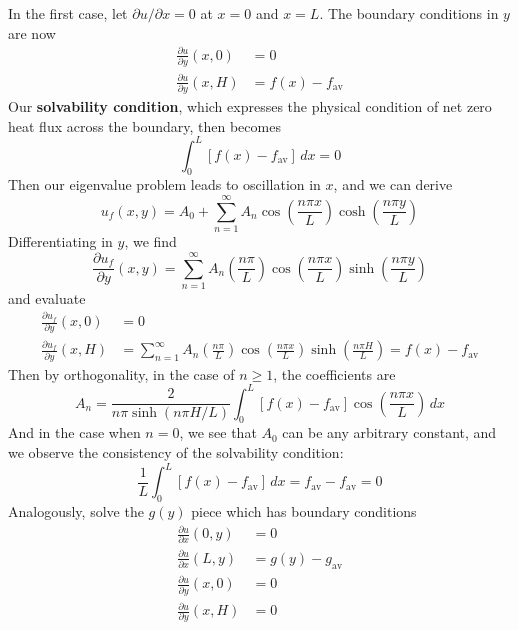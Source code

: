 \documentclass[a4paper]{article}
\begin{document}
\begin{enumerate}[label=(\alph*)]
	In the first case, let \( \partial u / \partial x = 0 \) at \( x = 0 \) and \( x = L \). The boundary conditions in \( y \) are now
	\begin{align*}
		\frac{\partial u}{\partial y}\!\left( x,0 \right) & = 0 \\
		\frac{\partial u}{\partial y}\!\left( x,H \right) & = f \!\left( x \right) - f_{\text{av}}
	\end{align*}
	Our \textbf{solvability condition}, which expresses the physical condition of net zero heat flux across the boundary, then becomes
	\[
		\int^{L}_{0} \!\left[ f \!\left( x \right) - f_{\text{av}} \right] \, dx = 0
	\]
	Then our eigenvalue problem leads to oscillation in \( x \), and we can derive
	\[
		u_{f}\!\left( x,y \right) = A_{0} + \sum^{\infty}_{n=1} A_{n}\cos\!\left(\frac{n \pi x}{L}\right)\cosh\!\left(\frac{n \pi y}{L}\right) 
	\]
	Differentiating in \( y \), we find
	\[
		\frac{\partial u_{f}}{\partial y}\!\left( x,y \right) = \sum^{\infty}_{n=1} A_{n}\!\left( \frac{n \pi}{L} \right)\cos\!\left(\frac{n \pi x}{L}\right)\sinh\!\left(\frac{n \pi y}{L}\right) 
	\]
	and evaluate
	\begin{align*}
		\frac{\partial u_{f}}{\partial y}\!\left( x,0 \right) & = 0 \\
		\frac{\partial u_{f}}{\partial y}\!\left( x,H \right) & = \sum^{\infty}_{n=1} A_{n}\!\left( \frac{n \pi}{L} \right)\cos\!\left(\frac{n \pi x}{L}\right)\sinh\!\left(\frac{n \pi H}{L}\right) = f \!\left( x \right) - f_{\text{av}}
	\end{align*}
	Then by orthogonality, in the case of \( n \ge 1 \), the coefficients are
	\[
		A_{n} = \frac{2}{n \pi \sinh\!\left(n \pi H / L\right)}\int^{L}_{0} \!\left[ f \!\left( x \right) - f_{\text{av}} \right]\cos\!\left(\frac{n \pi x}{L}\right) \, dx
	\]
	And in the case when \( n = 0 \), we see that \( A_{0} \) can be any arbitrary constant, and we observe the consistency of the solvability condition:
	\[
		\frac{1}{L}\int^{L}_{0} \!\left[ f \!\left( x \right) - f_{\text{av}} \right] \, dx = f_{\text{av}} - f_{\text{av}} = 0
	\]
	Analogously, solve the \( g \!\left( y \right) \) piece which has boundary conditions
	\begin{align*}
		\frac{\partial u}{\partial x}\!\left( 0,y \right) & = 0 \\
		\frac{\partial u}{\partial x}\!\left( L,y \right) & = g \!\left( y \right) - g_{\text{av}} \\ 
		\frac{\partial u}{\partial y}\!\left( x,0 \right) & = 0 \\
		\frac{\partial u}{\partial y}\!\left( x,H \right) & = 0

\end{align*}
\end{enumerate}
\end{document}

